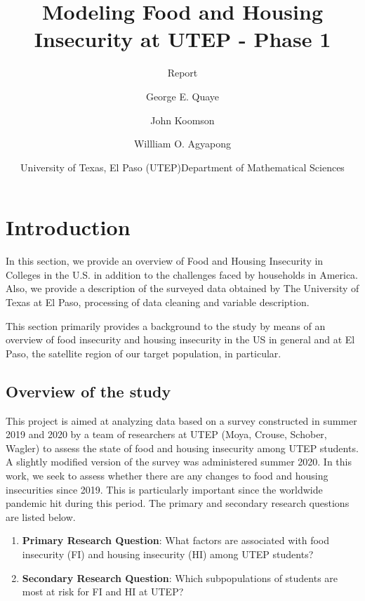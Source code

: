 \documentclass[
  10pt,
]{article}
\title{Modeling Food and Housing Insecurity at UTEP - Phase 1}
\subtitle{Report}
\author{George E. Quaye \and John Koomson \and Willliam O. Agyapong}
\date{\center University of Texas, El Paso (UTEP)\center \center Department of Mathematical Sciences \center}
\begin{document}
\maketitle

{
\hypersetup{linkcolor=}
\setcounter{tocdepth}{4}
\tableofcontents
}
\newpage

\section{Introduction}

In this section, we provide an overview of Food and Housing Insecurity in Colleges in the U.S. in addition to the challenges faced by households in America. Also, we provide a description of the surveyed data obtained by The University of Texas at El Paso, processing of data cleaning and variable description.

This section primarily provides a background to the study by means of an overview of food insecurity and housing insecurity in the US in general and at El Paso, the satellite region of our target population, in particular.

\hypertarget{overview-of-the-study}{%
\subsection{Overview of the study}\label{overview-of-the-study}}

This project is aimed at analyzing data based on a survey constructed in summer 2019 and 2020 by a team of researchers at UTEP (Moya, Crouse, Schober, Wagler) to assess the state of food and housing insecurity among UTEP students. A slightly modified version of the survey was administered summer 2020. In this work, we seek to assess whether there are any changes to food and housing insecurities since 2019. This is particularly important since the worldwide pandemic hit during this period. The primary and secondary research questions are listed below.

\begin{enumerate}
\def\labelenumi{\arabic{enumi}.}
\item
  \textbf{Primary Research Question}: What factors are associated with food insecurity (FI) and housing insecurity (HI) among UTEP students?
\item
  \textbf{Secondary Research Question}: Which subpopulations of students are most at risk for FI and HI at UTEP?
\end{enumerate}
\end{document}
